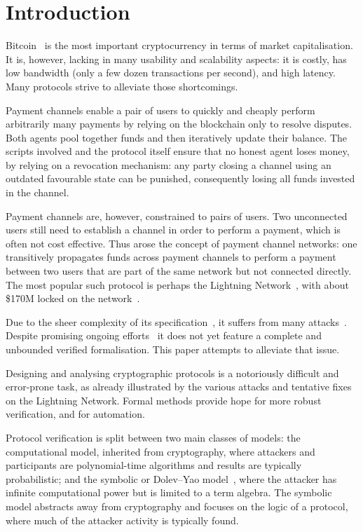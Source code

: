 \section{Introduction}

Bitcoin~\cite{nakamoto2008} is the most important cryptocurrency in terms of
market capitalisation. It is, however, lacking in many usability and
scalability aspects: it is costly, has low bandwidth (only a few dozen
transactions per second), and high latency. Many protocols strive to alleviate
those shortcomings.

Payment channels enable a pair of users to quickly and cheaply perform
arbitrarily many payments by relying on the blockchain only to resolve
disputes. Both agents pool together funds and then iteratively update their
balance. The scripts involved and the protocol itself ensure that no honest
agent loses money, by relying on a revocation mechanism: any party closing a
channel using an outdated favourable state can be punished, consequently losing
all funds invested in the channel.

Payment channels are, however, constrained to pairs of users. Two unconnected
users still need to establish a channel in order to perform a payment, which is
often not cost effective. Thus arose the concept of payment channel networks:
one transitively propagates funds across payment channels to perform a payment
between two users that are part of the same network but not connected directly.
The most popular such protocol is perhaps the Lightning
Network~\cite{poon2016lightning}, with about \$170M locked on the
network~\cite{oneml}.

Due to the sheer complexity of its specification~\cite{bolts}, it suffers from
many attacks~\cite{aumayr2021generalized, malavolta2019anonymous,
tikhomirov2020quantitative}. Despite promising ongoing
efforts~\cite{litos2026formally, grundmann2026security} it does not yet feature
a complete and unbounded verified formalisation. This paper attempts to
alleviate that issue.

Designing and analysing cryptographic protocols is a notoriously difficult and
error-prone task, as already illustrated by the various attacks and tentative
fixes on the Lightning Network. Formal methods provide hope for more robust
verification, and for automation.

Protocol verification is split between two main classes of models: the
computational model, inherited from cryptography, where attackers and
participants are polynomial-time algorithms and results are typically
probabilistic; and the symbolic or Dolev--Yao
model~\cite{dolev1983security}, where the attacker has infinite computational
power but is limited to a term algebra. The symbolic model abstracts away from
cryptography and focuses on the logic of a protocol, where much of the attacker
activity is typically found.

